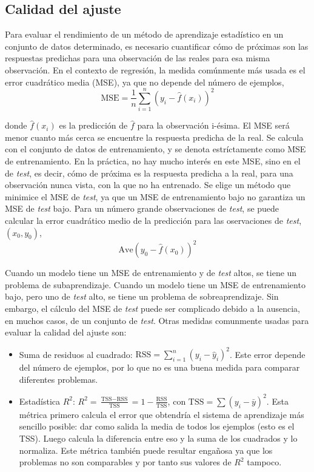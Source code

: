 \subsection{Calidad del ajuste}

Para evaluar el rendimiento de un método de aprendizaje estadístico en un conjunto de datos determinado, es necesario cuantificar cómo de próximas son las respuestas predichas para una observación de las reales para esa misma observación. En el contexto de regresión, la medida comúnmente más usada es el error cuadrático media (MSE), ya que no depende del número de ejemplos, 
\begin{equation}
\text{MSE} = \frac{1}{n} \sum_{i=1}^n (y_i - \hat{f}(x_i))^2
\end{equation}

\noindent donde $\hat{f}(x_i)$ es la predicción de $\hat{f}$ para la observación i-ésima. El MSE será menor cuanto más cerca se encuentre la respuesta predicha de la real. Se calcula con el conjunto de datos de entrenamiento, y se denota estríctamente como MSE de entrenamiento. En la práctica, no hay mucho interés en este MSE, sino en el de \textit{test}, es decir, cómo de próxima es la respuesta predicha a la real, para una observación nunca vista, con la que no ha entrenado. Se elige un método que minimice el MSE de \textit{test}, ya que un MSE de entrenamiento bajo no garantiza un MSE de \textit{test} bajo. Para un número grande observaciones de \textit{test}, se puede calcular la error cuadrático medio de la predicción para las oservaciones de \textit{test}, $(x_0, y_0)$, 
\begin{equation}
\text{Ave}(y_0 - \hat{f}(x_0))^2
\end{equation}

Cuando un modelo tiene un MSE de entrenamiento y de \textit{test} altos, se tiene un problema de subaprendizaje. Cuando un modelo tiene un MSE de entrenamiento bajo, pero uno de \textit{test} alto, se tiene un problema de sobreaprendizaje. Sin embargo, el cálculo del MSE de \textit{test} puede ser complicado debido a la ausencia, en muchos casos, de un conjunto de \textit{test}. Otras medidas comunmente usadas para evaluar la calidad del ajuste son:
\begin{itemize}
\item Suma de residuos al cuadrado: $\text{RSS} = \sum_{i = 1}^n (y_i - \hat{y}_i)^2$. Este error depende del número de ejemplos, por lo que no es una buena medida para comparar diferentes problemas.
\item Estadística $R^2$: $R^2 = \frac{\text{TSS} - \text{RSS}}{\text{TSS}} = 1 - \frac{\text{RSS}}{\text{TSS}}$, con $\text{TSS} = \sum (y_i - \bar{y})^2$. Esta métrica primero calcula el error que obtendría el sistema de aprendizaje más sencillo posible: dar como salida la media de todos los ejemplos (esto es el TSS). Luego calcula la diferencia entre eso y la suma de los cuadrados y lo normaliza. Este métrica también puede resultar engañosa ya que los problemas no son comparables y por tanto sus valores de $R^2$ tampoco.
\end{itemize}

